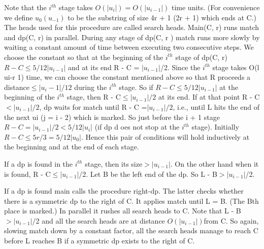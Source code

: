 \documentclass[11pt,a4paper]{report}
\begin{document}
Note that the $i^{th}$ stage takes $O(| u_i |) = O(| u_{i-1} |)$ time units. (For convenience we
define $u_0 (u_{-1})$ to be the substring of size 4r + 1 (2r + 1) which ends at C.) The heads 
used for this procedure are called search heads. Main(C, r) runs match and dp(C, r) in
parallel. During any stage of dp(C, r ) match runs more slowly by waiting a constant
amount of time between executing two consecutive steps. We choose the constant so that
at the beginning of the $i^{th}$ stage of dp(C, r) $R - C\leq 5/12 | u_{i-1} |$ and at its end R - C =
$ |u_{i-1}| $/2. Since the $i^{th}$ stage takes O(l ui-r 1) time, we can choose the constant mentioned
above so that R proceeds a distance$\leq |u_i - 1 |/12$ during the $i^{th}$ stage. So if
$ R - C \leq 5/12 | u_{i-1} |$ at the beginning of the $i^{th}$ stage, then R - C$\leq | u_{i-1} |/2$ at its end. If at that
point R - C$< |u_{i-1}|/2$, dp waits for match until R - C =$|  u_{i-1}| /2$, i.e., until L hits
the end of the next ui (j = i - 2) which is marked. So just before the i + 1 stage
$R - C = | u_{i-1}|/2<5/12|u_i|$ (if dp d oes not stop at the $i^{th}$ stage). Initially $R - C \leq
5r/3 = 5/12 | u_0 |$. Hence this pair of conditions will hold inductively at the beginning and
at the end of each stage.

If a dp is found in the $i^{th}$ stage, then its size$>|u_{i-1} |$. On the other hand when it is
found, R - C$\leq |u_{i-1} |$/2. Let B be the left end of the dp. So L - B$>| u_{i-1} |$/2.

If a dp is found main calls the procedure right-dp. The latter checks whether there is a
symmetric dp to the right of C. It applies match until L = B. (The Bth place is marked.)
In parallel it rushes all search heads to C. Note that L - B$>| u_{i-1} |$/2 and all the search
heads are at distance $O(|u_{i-1} |) $from C. So again, slowing match down by a constant
factor, all the search heads manage to reach C before L reaches B if a symmetric dp
exists to the right of C.
\end{document}

